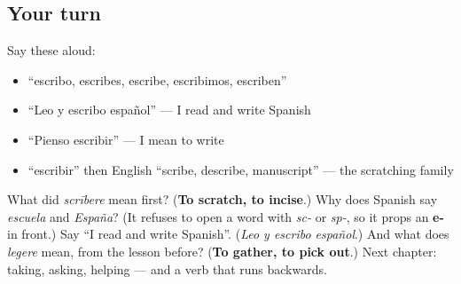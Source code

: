 \subsection*{Your turn}
Say these aloud:

\begin{itemize}
\raggedright
  \item \textquotedblleft{}escribo, escribes, escribe, escribimos, escriben\textquotedblright{}
  \item \textquotedblleft{}Leo y escribo español\textquotedblright{} — I read and write Spanish
  \item \textquotedblleft{}Pienso escribir\textquotedblright{} — I mean to write
  \item \textquotedblleft{}escribir\textquotedblright{} then English \textquotedblleft{}scribe, describe, manuscript\textquotedblright{} — the scratching family
\end{itemize}

\begin{tcolorbox}[breakable,colback=teal!4,colframe=teal!35!black,title={Before you move on}]
What did \emph{scrībere} mean first? (\textbf{To scratch, to incise}.) Why does Spanish say \emph{escuela} and \emph{España}? (It refuses to open a word with \emph{sc-} or \emph{sp-}, so it props an \textbf{e-} in front.) Say \textquotedblleft{}I read and write Spanish\textquotedblright{}. (\emph{Leo y escribo español}.) And what does \emph{legere} mean, from the lesson before? (\textbf{To gather, to pick out}.) Next chapter: taking, asking, helping — and a verb that runs backwards.
\end{tcolorbox}
